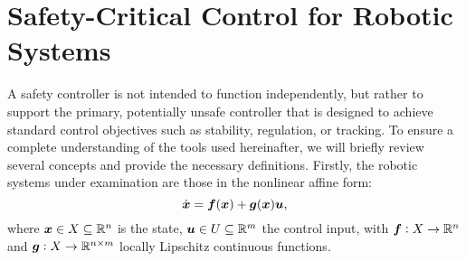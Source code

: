 




\section{Safety-Critical Control for Robotic Systems}
A safety controller is not intended to function independently, but rather to support the primary, potentially unsafe controller that is designed to achieve standard control objectives such as stability, regulation, or tracking. To ensure a complete understanding of the tools used hereinafter, we will briefly review several concepts and provide the necessary definitions. 
Firstly, the robotic systems under examination are those in the nonlinear affine form:
\begin{equation}
    \dot{\boldsymbol{x}}=\boldsymbol{f}(\boldsymbol{x})+\boldsymbol{g}(\boldsymbol{x})\boldsymbol{u},
    \label{eq:system}
\end{equation}
where $\boldsymbol{x}\in X\subseteq \mathbb{R}^n$ is the state, $\boldsymbol{u}\in U \subseteq \mathbb{R}^m$ the control input, with $\boldsymbol{f} : X\to\mathbb{R}^n$ and $\boldsymbol{g} : X\to\mathbb{R}^{n\times m} $ locally Lipschitz continuous functions. 
